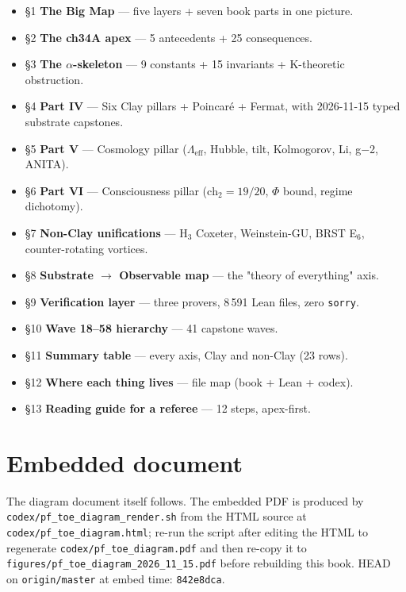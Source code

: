 \begin{itemize}
  \item \S1 \textbf{The Big Map} --- five layers + seven book parts in one picture.
  \item \S2 \textbf{The ch34A apex} --- 5 antecedents + 25 consequences.
  \item \S3 \textbf{The $\alpha$-skeleton} --- 9 constants + 15 invariants + K-theoretic obstruction.
  \item \S4 \textbf{Part IV} --- Six Clay pillars + Poincar\'e + Fermat, with 2026-11-15 typed substrate capstones.
  \item \S5 \textbf{Part V} --- Cosmology pillar ($\Lambda_{\mathrm{eff}}$, Hubble, tilt, Kolmogorov, Li, g$-$2, ANITA).
  \item \S6 \textbf{Part VI} --- Consciousness pillar ($\mathrm{ch}_2 = 19/20$, $\Phi$ bound, regime dichotomy).
  \item \S7 \textbf{Non-Clay unifications} --- H$_3$ Coxeter, Weinstein-GU, BRST E$_6$, counter-rotating vortices.
  \item \S8 \textbf{Substrate $\to$ Observable map} --- the "theory of everything" axis.
  \item \S9 \textbf{Verification layer} --- three provers, 8\,591 Lean files, zero \texttt{sorry}.
  \item \S10 \textbf{Wave 18--58 hierarchy} --- 41 capstone waves.
  \item \S11 \textbf{Summary table} --- every axis, Clay and non-Clay (23 rows).
  \item \S12 \textbf{Where each thing lives} --- file map (book + Lean + codex).
  \item \S13 \textbf{Reading guide for a referee} --- 12 steps, apex-first.
\end{itemize}

\section*{Embedded document}

The diagram document itself follows.  The embedded PDF is produced by
\texttt{codex/pf\_toe\_diagram\_render.sh} from the HTML source at
\texttt{codex/pf\_toe\_diagram.html}; re-run the script after editing the
HTML to regenerate \texttt{codex/pf\_toe\_diagram.pdf} and then re-copy
it to \texttt{figures/pf\_toe\_diagram\_2026\_11\_15.pdf} before rebuilding
this book.  HEAD on \texttt{origin/master} at embed time: \texttt{842e8dca}.


